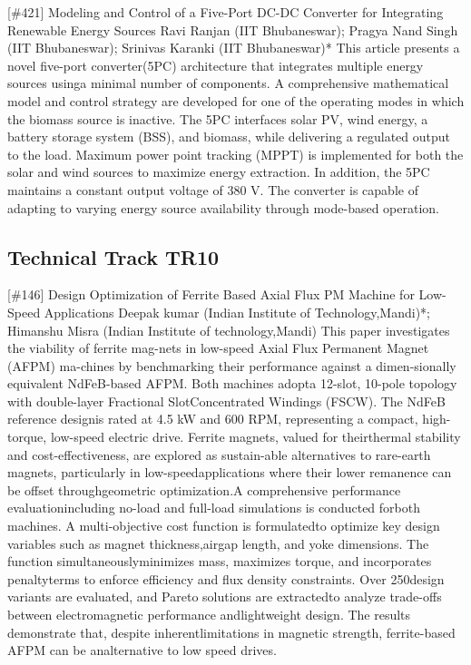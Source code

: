 {} \begin{abstract_online} {[\#421] Modeling and Control of a Five-Port DC-DC Converter for Integrating Renewable Energy Sources} {} {Ravi Ranjan (IIT Bhubaneswar); Pragya Nand Singh (IIT Bhubaneswar); Srinivas  Karanki (IIT Bhubaneswar)*} {} This article presents a novel five-port converter(5PC) architecture that integrates multiple energy sources usinga minimal number of components. A comprehensive mathematical model and control strategy are developed for one of the operating modes in which the biomass source is inactive. The 5PC interfaces solar PV, wind energy, a battery storage system (BSS), and biomass, while delivering a regulated output to the load. Maximum power point tracking (MPPT) is implemented for both the solar and wind sources to maximize energy extraction. In addition, the 5PC maintains a constant output voltage of 380 V. The converter is capable of adapting to varying energy source availability through mode-based operation. \end{abstract_online} 
\clearpage \subsection{Technical Track TR10}\nopagebreak {} \begin{abstract_online} {[\#146] Design Optimization of Ferrite Based Axial Flux PM Machine for Low-Speed Applications} {} {Deepak  kumar (Indian Institute of Technology,Mandi)*; Himanshu Misra (Indian Institute of technology,Mandi)} {} This paper investigates the viability of ferrite mag-nets in low-speed Axial Flux Permanent Magnet (AFPM) ma-chines by benchmarking their performance against a dimen-sionally equivalent NdFeB-based AFPM. Both machines adopta 12-slot, 10-pole topology with double-layer Fractional SlotConcentrated Windings (FSCW). The NdFeB reference designis rated at 4.5 kW and 600 RPM, representing a compact, high-torque, low-speed electric drive. Ferrite magnets, valued for theirthermal stability and cost-effectiveness, are explored as sustain-able alternatives to rare-earth magnets, particularly in low-speedapplications where their lower remanence can be offset throughgeometric optimization.A comprehensive performance evaluationincluding no-load and full-load simulations is conducted forboth machines. A multi-objective cost function is formulatedto optimize key design variables such as magnet thickness,airgap length, and yoke dimensions. The function simultaneouslyminimizes mass, maximizes torque, and incorporates penaltyterms to enforce efficiency and flux density constraints. Over 250design variants are evaluated, and Pareto solutions are extractedto analyze trade-offs between electromagnetic performance andlightweight design. The results demonstrate that, despite inherentlimitations in magnetic strength, ferrite-based AFPM can be analternative to low speed drives. \end{abstract_online} 

